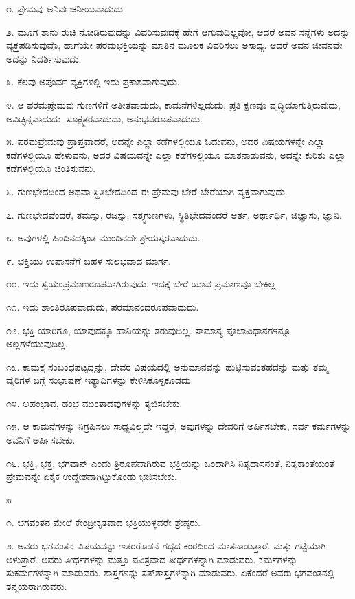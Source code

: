 ೧. ಪ್ರೇಮವು ಅನಿರ್ವಚನೀಯವಾದುದು

೨. ಮೂಗ ತಾನು ರುಚಿ ನೋಡಿರುವುದನ್ನು ವಿವರಿಸುವುದಕ್ಕೆ ಹೇಗೆ ಆಗುವುದಿಲ್ಲವೋ, ಆದರೆ ಅವನ ಸನ್ನೆಗಳು ಅದನ್ನು ವ್ಯಕ್ತಪಡಿಸುವುವೊ, ಹಾಗೆಯೇ ಪರಮಭಕ್ತಿಯನ್ನು ಮಾತಿನ ಮೂಲಕ ವಿವರಿಸಲು ಅಸಾಧ್ಯ. ಆದರೆ ಅವನ ಜೀವನವೇ ಅದನ್ನು ನಿದರ್ಶಿಸುವುದು.

೩. ಕೆಲವು ಅಪೂರ್ವ ವ್ಯಕ್ತಿಗಳಲ್ಲಿ ಇದು ಪ್ರಕಾಶವಾಗುವುದು.

೪. ಆ ಪರಮಪ್ರೇಮವು ಗುಣಗಳಿಗೆ ಅತೀತವಾದುದು, ಕಾಮನೆಗಳಿಲ್ಲದುದು, ಪ್ರತಿ ಕ್ಷಣವೂ ವೃದ್ಧಿಯಾಗುತ್ತಿರುವುದು, ಅವಿಚ್ಛಿನ್ನವಾದುದು, ಸೂಕ್ಷ್ಮತರವಾದುದು, ಅನುಭವರೂಪವಾದುದು.

೫. ಪರಮಪ್ರೇಮವು ಪ್ರಾಪ್ತವಾದರೆ, ಅದನ್ನೇ ಎಲ್ಲಾ ಕಡೆಗಳಲ್ಲಿಯೂ ಓದುವನು, ಅದರ ವಿಷಯಗಳನ್ನೇ ಎಲ್ಲಾ ಕಡೆಗಳಲ್ಲಿಯೂ ಹೇಳುವನು, ಅದರ ವಿಷಯವನ್ನೇ ಎಲ್ಲಾ ಕಡೆಗಳಲ್ಲಿಯೂ ಮಾತನಾಡುವನು, ಅದನ್ನೇ ಕುರಿತು ಎಲ್ಲಾ ಕಡೆಗಳಲ್ಲಿಯೂ ಚಿಂತಿಸುವನು.

೬. ಗುಣಭೇದದಿಂದ ಅಥವಾ ಸ್ಥಿತಿಭೇದದಿಂದ ಈ ಪ್ರೇಮವು ಬೇರೆ ಬೇರೆಯಾಗಿ ವ್ಯಕ್ತವಾಗುವುದು.

೭. ಗುಣಭೇದವೆಂದರೆ, ತಮಸ್ಸು, ರಜಸ್ಸು, ಸತ್ತ್ವಗುಣಗಳು, ಸ್ಥಿತಿಭೇದವೆಂದರೆ ಆರ್ತ, ಅರ್ಥಾರ್ಥಿ, ಜಿಜ್ಞಾಸು, ಜ್ಞಾನಿ.

೮. ಅವುಗಳಲ್ಲಿ ಹಿಂದಿನದಕ್ಕಿಂತ ಮುಂದಿನದೇ ಶ್ರೇಯಸ್ಕರವಾದುದು.

೯. ಭಕ್ತಿಯು ಉಪಾಸನೆಗೆ ಬಹಳ ಸುಲಭವಾದ ಮಾರ್ಗ.

೧೦. ಇದು ಸ್ವಯಂಪ್ರಮಾಣರೂಪವಾಗಿರುವುದು. ಇದಕ್ಕೆ ಬೇರೆ ಯಾವ ಪ್ರಮಾಣವೂ ಬೇಕಿಲ್ಲ.

೧೧. ಇದು ಶಾಂತಿರೂಪವಾದುದು, ಪರಮಾನಂದರೂಪವಾದುದು.

೧೨. ಭಕ್ತಿ ಯಾರಿಗೂ, ಯಾವುದಕ್ಕೂ ಹಾನಿಯನ್ನು ತರುವುದಿಲ್ಲ. ಸಾಮಾನ್ಯ ಪೂಜಾವಿಧಾನಗಳನ್ನೂ ಅಲ್ಲಗಳೆಯುವುದಿಲ್ಲ.

೧೩. ಕಾಮಕ್ಕೆ ಸಂಬಂಧಪಟ್ಟದ್ದನ್ನು, ದೇವರ ವಿಷಯದಲ್ಲಿ ಅನುಮಾನವನ್ನು ಹುಟ್ಟಿಸುವಂತಹದನ್ನು ಮತ್ತು ತಮ್ಮ ವೈರಿಗಳ ಬಗ್ಗೆ ಸಂಭಾಷಣೆ ಇತ್ಯಾದಿಗಳನ್ನು ಕೇಳಿಸಿಕೊಳ್ಳಕೂಡದು.

೧೪. ಅಹಂಭಾವ, ಡಂಭ ಮುಂತಾದವುಗಳನ್ನು ತ್ಯಜಿಸಬೇಕು.

೧೫. ಆ ಕಾಮನೆಗಳನ್ನು ನಿಗ್ರಹಿಸಲು ಸಾಧ್ಯವಿಲ್ಲದೇ ಇದ್ದರೆ, ಅವುಗಳನ್ನು ದೇವರಿಗೆ ಅರ್ಪಿಸಬೇಕು, ಸರ್ವ ಕರ್ಮಗಳನ್ನು ಅವನಿಗೆ ಅರ್ಪಿಸಬೇಕು.

೧೬. ಭಕ್ತಿ, ಭಕ್ತ, ಭಗವಾನ್​ ಎಂದು ತ್ರಿರೂಪವಾಗಿರುವ ಭಕ್ತಿಯನ್ನು ಒಂದಾಗಿಸಿ ನಿತ್ಯದಾಸನಂತೆ, ನಿತ್ಯಕಾಂತೆಯಂತೆ ಪ್ರೇಮವನ್ನೇ ಏಕೈಕ ಉದ್ದೇಶವಾಗಿಟ್ಟುಕೊಂಡು ಭಜಿಸಬೇಕು.

\begin{center}
೫
\end{center}

೧. ಭಗವಂತನ ಮೇಲೆ ಕೇಂದ್ರೀಕೃತವಾದ ಭಕ್ತಿಯುಳ್ಳವರೇ ಶ್ರೇಷ್ಠರು.

೨. ಅವರು ಭಗವಂತನ ವಿಷಯವನ್ನು ಇತರರೊಡನೆ ಗದ್ಗದ ಕಂಠದಿಂದ ಮಾತನಾಡುತ್ತಾರೆ. ಮತ್ತು ಗಟ್ಟಿಯಾಗಿ ಅಳುತ್ತಾರೆ. ಅವರು ತೀರ್ಥಗಳನ್ನು ಮತ್ತೂ ಪವಿತ್ರವಾದ ತೀರ್ಥಗಳನ್ನಾಗಿ ಮಾಡುವರು. ಕರ್ಮಗಳನ್ನು ಸುಕರ್ಮಗಳನ್ನಾಗಿ ಮಾಡುವರು. ಶಾಸ್ತ್ರಗಳನ್ನು ಸತ್​ಶಾಸ್ತ್ರಗಳನ್ನಾಗಿ ಮಾಡುವರು. ಏಕೆಂದರೆ ಅವರು ಭಗವಂತನಲ್ಲಿ ತನ್ಮಯರಾಗಿರುವರು.

